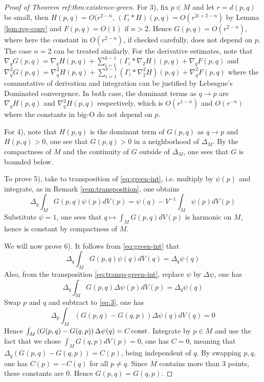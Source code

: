\begin{proof}[Proof of Theorem ref:thm:existence-green]
For 3), fix \(p\in M\) and let \(r=d(p,q)\) be small, then \(H(p,q) = O(r^{2-n}\),
\((\Gamma_i*H)(p,q) = O(r^{2i+2-n})\) by Lemma \ref{lem:reg-conv} and \(F(p,q)=O(1)\) if
\(n>2\). Hence \(G(p,q)=O(r^{2-n})\), where here the constant in \(O(r^{2-n})\), if
checked carefully, does not depend on \(p\). The case \(n=2\) can be treated
similarly.
For the derivative estimates, note that \(\nabla_q G(p,q) = \nabla_q H(p,q) +
\sum_{i=1}^{k-1}(\Gamma_i * \nabla_2 H)(p,q) + \nabla_q F(p,q)\) and \(\nabla_q^2 G(p,q) = \nabla_q^2 H(p,q) +
\sum_{i=1}^{k-1}(\Gamma_i * \nabla_2^2 H)(p,q) + \nabla_q^2 F(p,q)\)
where the commutative of derivation and integration can be justified by Lebesgue's
Dominated convergence. In both case, the dominant terms as \(q\to p\) are \(\nabla_q
H(p,q)\) and \(\nabla^2_q H(p,q)\) respectively, which is \(O(r^{1-n})\) and \(O(r^{-n})\) where the constants in big-O do not depend on \(p\).

For 4), note that \(H(p,q)\) is the dominant term of \(G(p,q)\) as \(q\to p\) and \(H(p,q)>0\), one see that \(G(p,q) >0\) in a neighborhood of \(\Delta_M\). By the
compactness of \(M\) and the continuity of \(G\) outside of \(\Delta_M\), one sees
that \(G\) is bounded below.

To prove 5), take to transposition of \eqref{eq:green-int}, i.e. multiply by \(\psi(p)\) and
integrate, as in Remark \ref{rem:transposition}, one obtains
\begin{equation}
\label{eq:transp-green-int}
\Delta_q\int_M G(p,q)\psi(p) dV(p) = \psi(q) -V^{-1}\int_M \psi(p) dV(p)
\end{equation}
Substitute \(\psi=1\), one sees that \(q\mapsto \int_M G(p,q) dV(p)\) is harmonic on
\(M\), hence is constant by compactness of \(M\).

We will now prove 6). It follows from \eqref{eq:green-int} that
\begin{equation}
\label{eq:3}
 \Delta_q\int_M G(p,q)\psi(q) dV(q) = \Delta_q \psi(q)
\end{equation}
Also, from the transposition \eqref{eq:transp-green-int}, replace \(\psi\) by \(\Delta\psi\), one has
\[
 \Delta_q\int_M G(p,q)\Delta\psi(p) dV(p) = \Delta_q \psi(q)
\]
Swap \(p\) and \(q\) and subtract to \eqref{eq:3}, one has
\[
 \Delta_p\int_M\left(G(p,q) - G(q,p) \right)\Delta\psi(q) dV(q) = 0
\]
Hence \(\int_M\left(G(p,q) - G(q,p) \right)\Delta\psi(q) = C \mathop{\rm const }\nolimits\). Integrate by \(p\in M\) and use the fact that we chose \(\int_M G(q,p) dV(p) = 0\), one has \(C=0\),
meaning that \(\Delta_q \left(G(p,q) - G(q,p) \right) = C(p)\), being independent of \(q\). By swapping \(p,q\), one has \(C(p) = -C(q)\) for all \(p\ne q\). Since \(M\) contains more than 3 points, these constants are 0. Hence \(G(p,q) = G(q,p)\).


\end{proof}
